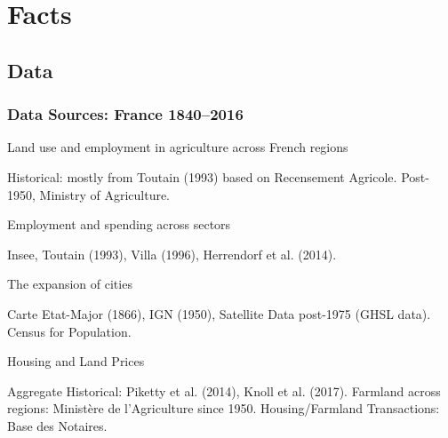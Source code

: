 \documentclass[aspectratio=169]{beamer}
\begin{document}
\begin{v75mins}

\end{v75mins}


\section{Facts}
\subsection{Data}

\begin{v75mins}
\begin{frame}
\frametitle{Data Sources: France 1840--2016}
\bi
\item Land use and employment in agriculture across French regions
\bi\item Historical: mostly from Toutain (1993) based on Recensement Agricole. Post-1950, Ministry of Agriculture. \ei
\bigskip
\item Employment and spending across sectors
\bi\item Insee, Toutain (1993), Villa (1996), Herrendorf et al. (2014).\ei
\bigskip
\item The expansion of cities
\bi\item Carte Etat-Major (1866), IGN (1950), Satellite Data post-1975 (GHSL data). Census for Population.
\ei
\bigskip
\item Housing and Land Prices
\bi\item Aggregate Historical: Piketty et al. (2014), Knoll et al. (2017). Farmland across regions: Ministère de l'Agriculture since 1950. Housing/Farmland Transactions: Base des Notaires.
\ei
\ei
\end{frame}
\end{v75mins}
\end{document}
